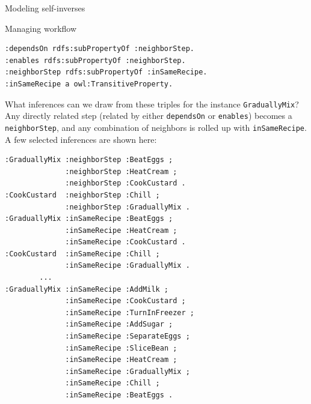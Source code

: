 \begin{challenge}{Modeling self-inverses}
\begin{challenge}{Managing workflow}
\begin{lstlisting}
:dependsOn rdfs:subPropertyOf :neighborStep.
:enables rdfs:subPropertyOf :neighborStep.
:neighborStep rdfs:subPropertyOf :inSameRecipe.
:inSameRecipe a owl:TransitiveProperty.
\end{lstlisting}

What inferences can we draw from these triples for the instance
\texttt{GraduallyMix}? Any directly related step (related by either \texttt{dependsOn} or
\texttt{enables}) becomes a \texttt{neighborStep}, and any combination of neighbors is
rolled up with \texttt{inSameRecipe}. A few selected inferences are shown here:

\begin{lstlisting}
:GraduallyMix :neighborStep :BeatEggs ;
              :neighborStep :HeatCream ;
              :neighborStep :CookCustard .
:CookCustard  :neighborStep :Chill ;
              :neighborStep :GraduallyMix .
:GraduallyMix :inSameRecipe :BeatEggs ;
              :inSameRecipe :HeatCream ;
              :inSameRecipe :CookCustard .
:CookCustard  :inSameRecipe :Chill ;
              :inSameRecipe :GraduallyMix .
        ...
:GraduallyMix :inSameRecipe :AddMilk ;
              :inSameRecipe :CookCustard ;
              :inSameRecipe :TurnInFreezer ;
              :inSameRecipe :AddSugar ;
              :inSameRecipe :SeparateEggs ;
              :inSameRecipe :SliceBean ;
              :inSameRecipe :HeatCream ;
              :inSameRecipe :GraduallyMix ;
              :inSameRecipe :Chill ;
              :inSameRecipe :BeatEggs .
\end{lstlisting}




\end{challenge}
\end{challenge}
